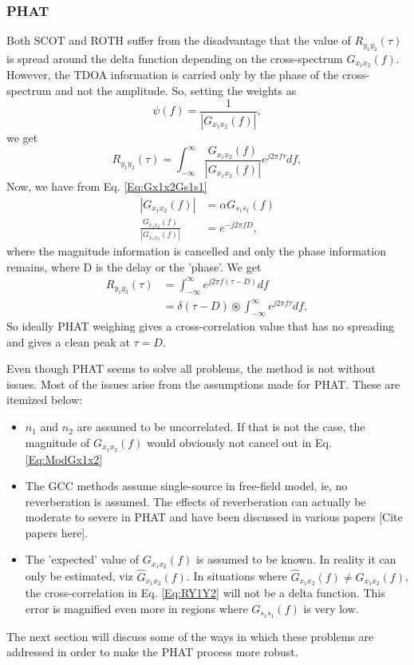 \subsubsection{PHAT}
Both SCOT and ROTH suffer from the disadvantage that the value of ${R}_{y_1y_2}(\tau)$ is spread around the delta function depending on the cross-spectrum ${G}_{x_1x_2}(f)$. However, the TDOA information is carried only by the phase of the cross-spectrum and not the amplitude. So, setting the weights as
\begin{equation}
            \psi(f) = \frac{1}{|G_{x_1x_2}(f)|},
\end{equation}
we get
\begin{equation}
        {R}_{y_1y_2}(\tau) = \int_{-\infty}^{\infty}\frac{{G}_{x_1x_2}(f)}{|G_{x_1x_2}(f)|}e^{j2\pi f\tau}   df,
\end{equation}
Now, we have from Eq. \ref{Eq:Gx1x2Gs1s1}
\begin{equation}
\begin{split}
        |G_{x_1x_2}(f)| &= \alpha G_{s_1s_1}(f) \\
    \frac{{G}_{x_1x_2}(f)}{|G_{x_1x_2}(f)|}&=e^{-j2\pi fD},
\end{split}
\label{Eq:ModGx1x2}
\end{equation}
where the magnitude information is cancelled and only the phase information remains, where D is the delay or the 'phase'. We get
\begin{equation}
\begin{split}
            {R}_{y_1y_2}(\tau) &= \int_{-\infty}^{\infty}e^{j2\pi f(\tau - D)}   df \\
                           &=  \delta (\tau - D) \circledast \int_{-\infty}^{\infty}e^{j2\pi f\tau} df,
\end{split}
\label{Eq:RY1Y2}
\end{equation}
So ideally PHAT weighing gives a cross-correlation value that has no spreading and gives a clean peak at $\tau=D$.

Even though PHAT seems to solve all problems, the method is not without issues. Most of the issues arise from the assumptions made for PHAT. These are itemized below: 
\begin{itemize}
    \item $n_1$ and $n_2$ are assumed to be uncorrelated. If that is not the case, the magnitude of $G_{x_1x_2}(f)$ would obviously not cancel out in Eq. \ref{Eq:ModGx1x2}
    \item The GCC methods assume single-source in free-field model, ie, no reverberation is assumed. The effects of reverberation can actually be moderate to severe in PHAT and have been discussed in various papers [Cite papers here]. 
    \item The 'expected' value of $G_{x_1x_2}(f)$ is assumed to be known. In reality it can only be estimated, viz $\hat{G}_{x_1x_2}(f)$. In situations where $\hat{G}_{x_1x_2}(f) \neq G_{x_1x_2}(f)$, the cross-correlation in Eq. \ref{Eq:RY1Y2} will not be a delta function. This error is magnified even more in regions where $G_{s_1s_1}(f)$ is very low.
\end{itemize}  

The next section will discuss some of the ways in which these problems are addressed in order to make the PHAT process more robust. 